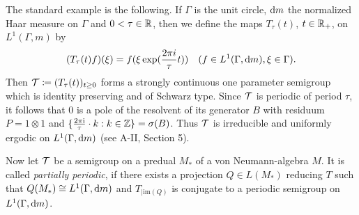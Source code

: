 The standard example is the following.
If $ \Gamma $  is the unit circle, $ \mathop{}\!\mathrm{d}{m} $  the normalized Haar measure on $ \Gamma $  and $ 0 < \tau \in \mathbb{R} $, then we define the maps $ T_{\tau}(t) $, $ t \in \mathbb{R}_{+} $, on $ L^{1}(\Gamma,m) $  by
\[
(T_{\tau}(t)f)(\xi) = f(\xi\exp(\frac{2\pi i}{\tau}t)) \quad (f \in L^{1}(\Gamma,\mathop{}\!\mathrm{d}{m}), \xi \in \Gamma).
\]
Then $ \mathcal{T} \coloneqq (T_{\tau}(t))_{t \geq 0} $  forms a strongly continuous one parameter semigroup which is identity preserving and of Schwarz type.
Since $ \mathcal{T} $  is periodic of period $ \tau $, it follows that 0 is a pole of the resolvent of its generator $ B $  with residuum $ P = 1 \otimes 1 $  and $ \{\frac{2\pi \mathrm{i}}{\tau} \cdot k: k \in \mathbb{Z}\} = \sigma(B) $.
Thus $ \mathcal{T} $  is irreducible and uniformly ergodic on $ L^{1}(\Gamma,\mathop{}\!\mathrm{d}{m}) $  (see A-II, Section 5).

Now let $ \mathcal{T} $  be a semigroup on a predual $ M_{*} $ of a von Neumann-algebra $ M $.
It is called \emph{partially periodic}, if there exists a projection $ Q \in L(M_{*}) $  reducing $ T $  such that $ Q(M_{*}) \cong L^{1}(\Gamma,\mathop{}\!\mathrm{d}{m}) $  and $ T_{| \text{im}(Q)} $  is conjugate to a periodic semigroup on $ L^{1}(\Gamma,\mathop{}\!\mathrm{d}{m}) $.

